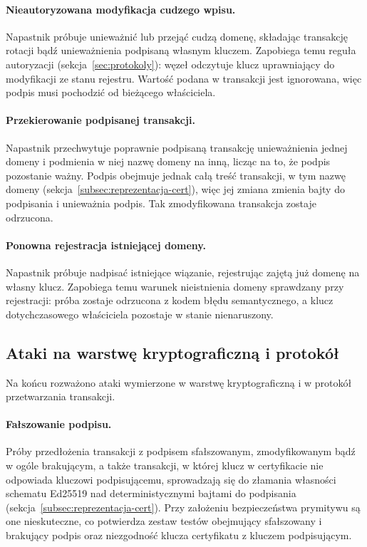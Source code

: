 \paragraph{Nieautoryzowana modyfikacja cudzego wpisu.} Napastnik próbuje unieważnić lub przejąć cudzą domenę, składając transakcję rotacji bądź unieważnienia podpisaną własnym kluczem. Zapobiega temu reguła autoryzacji (sekcja~\ref{sec:protokoly}): węzeł odczytuje klucz uprawniający do modyfikacji ze stanu rejestru. Wartość podana w transakcji jest ignorowana, więc podpis musi pochodzić od bieżącego właściciela.

\paragraph{Przekierowanie podpisanej transakcji.} Napastnik przechwytuje poprawnie podpisaną transakcję unieważnienia jednej domeny i podmienia w niej nazwę domeny na inną, licząc na to, że podpis pozostanie ważny. Podpis obejmuje jednak całą treść transakcji, w tym nazwę domeny (sekcja~\ref{subsec:reprezentacja-cert}), więc jej zmiana zmienia bajty do podpisania i unieważnia podpis. Tak zmodyfikowana transakcja zostaje odrzucona.

\paragraph{Ponowna rejestracja istniejącej domeny.} Napastnik próbuje nadpisać istniejące wiązanie, rejestrując zajętą już domenę na własny klucz. Zapobiega temu warunek nieistnienia domeny sprawdzany przy rejestracji: próba zostaje odrzucona z kodem błędu semantycznego, a klucz dotychczasowego właściciela pozostaje w stanie nienaruszony.

\subsection{Ataki na warstwę kryptograficzną i protokół}
\label{subsec:ataki-kryptograficzne}

Na końcu rozważono ataki wymierzone w warstwę kryptograficzną i w protokół przetwarzania transakcji.

\paragraph{Fałszowanie podpisu.} Próby przedłożenia transakcji z podpisem sfałszowanym, zmodyfikowanym bądź w ogóle brakującym, a także transakcji, w której klucz w certyfikacie nie odpowiada kluczowi podpisującemu, sprowadzają się do złamania własności schematu Ed25519 nad deterministycznymi bajtami do podpisania (sekcja~\ref{subsec:reprezentacja-cert}). Przy założeniu bezpieczeństwa prymitywu są one nieskuteczne, co potwierdza zestaw testów obejmujący sfałszowany i brakujący podpis oraz niezgodność klucza certyfikatu z kluczem podpisującym.

